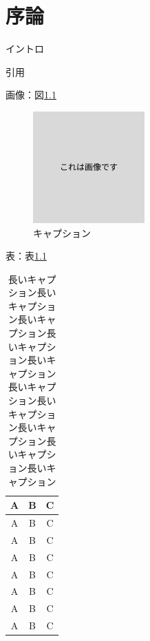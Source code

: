\documentclass[a4paper, 12pt]{ltjsreport}
\begin{document}
\chapter{序論}
イントロ 

引用\cite{Lang_2010}

画像：図\ref{fig:01_image}
\begin{figure}[ht]
  \centering
  \includegraphics[keepaspectratio, scale=1.0]
  {assets/01_image.png}
  \caption{キャプション}
  \label{fig:01_image}
\end{figure}

表：表\ref{table:01_table}
\begin{table}[ht]
  \centering
  \begin{tabular}{|c|c|c|} \hline
    A & B    & C  \\ \hline
    A & B    & C  \\ \hline
    A & B    & C  \\ \hline
    A & B    & C  \\ \hline
    A & B    & C  \\ \hline
    A & B    & C  \\ \hline
    A & B    & C  \\ \hline
    A & B    & C  \\ \hline
  \end{tabular}
  \caption{長いキャプション長いキャプション長いキャプション長いキャプション長いキャプション長いキャプション長いキャプション長いキャプション長いキャプション長いキャプション}
  \label{table:01_table}
\end{table}
\subbib
\end{document}
